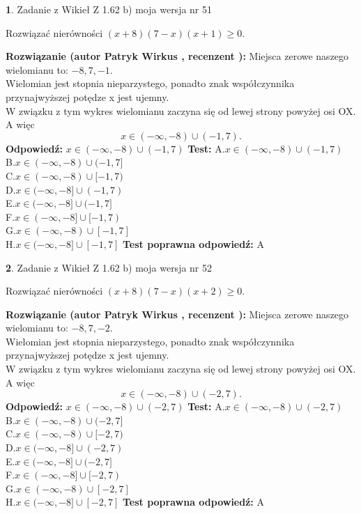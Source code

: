 \documentclass[12pt, a4paper]{article}
\theoremstyle{definition} %
\newtheorem{zad}{}
\newcommand{\zadStart}[1]{\begin{zad}#1\newline}
\newcommand{\zadStop}{\end{zad}}
\newcommand{\rozwStart}[2]{\noindent \textbf{Rozwiązanie (autor #1 , recenzent #2): }\newline}
\newcommand{\rozwStop}{\newline}
\newcommand{\odpStart}{\noindent \textbf{Odpowiedź:}\newline}
\newcommand{\odpStop}{\newline}
\newcommand{\testStart}{\noindent \textbf{Test:}\newline}
\newcommand{\testStop}{\newline}
\newcommand{\kluczStart}{\noindent \textbf{Test poprawna odpowiedź:}\newline}
\newcommand{\kluczStop}{\newline}
\begin{document}
\zadStart{Zadanie z Wikieł Z 1.62 b) moja wersja nr 51}

Rozwiązać nierówności $(x+8)(7-x)(x+1)\ge0$.
\zadStop
\rozwStart{Patryk Wirkus}{}
Miejsca zerowe naszego wielomianu to: $-8, 7, -1$.\\
Wielomian jest stopnia nieparzystego, ponadto znak współczynnika przy\linebreak najwyższej potędze x jest ujemny.\\ W związku z tym wykres wielomianu zaczyna się od lewej strony powyżej osi OX. A więc $$x \in (-\infty,-8) \cup (-1,7).$$
\rozwStop
\odpStart
$x \in (-\infty,-8) \cup (-1,7)$
\odpStop
\testStart
A.$x \in (-\infty,-8) \cup (-1,7)$\\
B.$x \in (-\infty,-8) \cup (-1,7]$\\
C.$x \in (-\infty,-8) \cup [-1,7)$\\
D.$x \in (-\infty,-8] \cup (-1,7)$\\
E.$x \in (-\infty,-8] \cup (-1,7]$\\
F.$x \in (-\infty,-8] \cup [-1,7)$\\
G.$x \in (-\infty,-8) \cup [-1,7]$\\
H.$x \in (-\infty,-8] \cup [-1,7]$
\testStop
\kluczStart
A
\kluczStop



\zadStart{Zadanie z Wikieł Z 1.62 b) moja wersja nr 52}

Rozwiązać nierówności $(x+8)(7-x)(x+2)\ge0$.
\zadStop
\rozwStart{Patryk Wirkus}{}
Miejsca zerowe naszego wielomianu to: $-8, 7, -2$.\\
Wielomian jest stopnia nieparzystego, ponadto znak współczynnika przy\linebreak najwyższej potędze x jest ujemny.\\ W związku z tym wykres wielomianu zaczyna się od lewej strony powyżej osi OX. A więc $$x \in (-\infty,-8) \cup (-2,7).$$
\rozwStop
\odpStart
$x \in (-\infty,-8) \cup (-2,7)$
\odpStop
\testStart
A.$x \in (-\infty,-8) \cup (-2,7)$\\
B.$x \in (-\infty,-8) \cup (-2,7]$\\
C.$x \in (-\infty,-8) \cup [-2,7)$\\
D.$x \in (-\infty,-8] \cup (-2,7)$\\
E.$x \in (-\infty,-8] \cup (-2,7]$\\
F.$x \in (-\infty,-8] \cup [-2,7)$\\
G.$x \in (-\infty,-8) \cup [-2,7]$\\
H.$x \in (-\infty,-8] \cup [-2,7]$
\testStop
\kluczStart
A
\kluczStop
\end{document}
